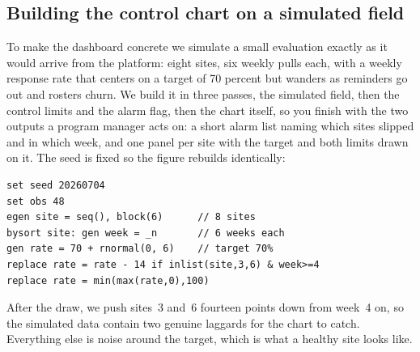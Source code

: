 \documentclass[
    a4paper,
    fontsize=10pt,
    twoside=true,
    numbers=noenddot,
]{kaobook}
\begin{document}
\subsection{Building the control chart on a simulated field}\label{sec:monitor-build}
To make the dashboard concrete we simulate a small evaluation exactly as it would arrive from the platform: eight sites, six weekly pulls each, with a weekly response rate that centers on a target of 70 percent but wanders as reminders go out and rosters churn. We build it in three passes, the simulated field, then the control limits and the alarm flag, then the chart itself, so you finish with the two outputs a program manager acts on: a short alarm list naming which sites slipped and in which week, and one panel per site with the target and both limits drawn on it. The seed is fixed so the figure rebuilds identically:
\par
{\footnotesize
\begin{verbatim}
set seed 20260704
set obs 48
egen site = seq(), block(6)      // 8 sites
bysort site: gen week = _n       // 6 weeks each
gen rate = 70 + rnormal(0, 6)    // target 70%
replace rate = rate - 14 if inlist(site,3,6) & week>=4
replace rate = min(max(rate,0),100)
\end{verbatim}
}
After the draw, we push sites~3 and~6 fourteen points down from week~4 on, so the simulated data contain two genuine laggards for the chart to catch. Everything else is noise around the target, which is what a healthy site looks like.
\end{document}
